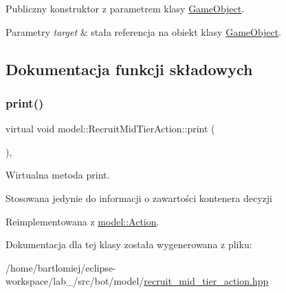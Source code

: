 Publiczny konstruktor z parametrem klasy \hyperlink{classmodel_1_1GameObject}{Game\+Object}. 


\begin{DoxyParams}{Parametry}
{\em target} & stała referencja na obiekt klasy \hyperlink{classmodel_1_1GameObject}{Game\+Object}. \\
\hline
\end{DoxyParams}


\subsection{Dokumentacja funkcji składowych}
\mbox{\label{classmodel_1_1RecruitMidTierAction_a91d571781540c34eea70643518e4a33d}} 
\subsubsection{\texorpdfstring{print()}{print()}}
{\footnotesize\ttfamily virtual void model\+::\+Recruit\+Mid\+Tier\+Action\+::print (\begin{DoxyParamCaption}{ }\end{DoxyParamCaption})\hspace{0.3cm}{\ttfamily [inline]}, {\ttfamily [virtual]}}



Wirtualna metoda print. 

Stosowana jedynie do informacji o zawartości kontenera decyzji 

Reimplementowana z \hyperlink{classmodel_1_1Action_a2955dbb4a69e38a48aa07d730fe2d77c}{model\+::\+Action}.



Dokumentacja dla tej klasy została wygenerowana z pliku\+:\begin{DoxyCompactItemize}
\item 
/home/bartlomiej/eclipse-\/workspace/lab\+\_/src/bot/model/\hyperlink{recruit__mid__tier__action_8hpp}{recruit\+\_\+mid\+\_\+tier\+\_\+action.\+hpp}\end{DoxyCompactItemize}
